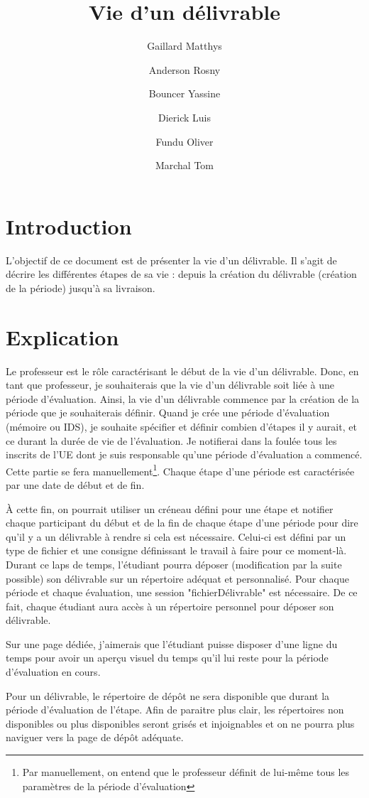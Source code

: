 \documentclass[a4paper,11pt, oneside]{article}
\title{Vie d'un délivrable}
\author{Gaillard Matthys \and Anderson Rosny \and Bouncer Yassine \and Dierick Luis \and Fundu Oliver\and Marchal Tom}
\newcommand{\li}{\newline}
\begin{document}
\maketitle
\section{Introduction}
    \par L'objectif de ce document est de présenter la vie d'un délivrable. Il s'agit de décrire les différentes étapes de sa vie : depuis
    la création du délivrable (création de la période) jusqu'à sa livraison. 
\section{Explication}
    \par Le professeur est le rôle caractérisant le début de la vie d'un délivrable. Donc, en tant que professeur, je 
    souhaiterais que la vie d'un délivrable soit liée à une période d'évaluation. Ainsi, la vie d'un délivrable commence par la création de la période que je souhaiterais définir.
    Quand je crée une période d'évaluation (mémoire ou IDS), je souhaite spécifier et définir combien d'étapes il y aurait, et ce durant la durée de vie de l'évaluation. Je notifierai
    dans la foulée tous les inscrits de l'UE dont je suis responsable qu'une période d'évaluation a commencé. Cette partie se fera manuellement\footnote{Par manuellement, on entend que le professeur définit de lui-même tous les paramètres de la période d'évaluation}. Chaque étape d'une période est caractérisée par une date de début et de fin.\li

    \par À cette fin, on pourrait utiliser un créneau défini pour une étape et notifier chaque participant du début et de la fin de chaque étape d'une période pour dire qu'il y a un délivrable à rendre si cela est nécessaire.
    Celui-ci est défini par un type de fichier et une consigne définissant le travail à faire pour ce moment-là. Durant ce laps de temps, l'étudiant pourra déposer (modification par la suite possible) son délivrable sur un répertoire adéquat et personnalisé. Pour chaque période et chaque évaluation, 
    une session "fichierDélivrable" est nécessaire. De ce fait, chaque étudiant aura accès à un répertoire personnel pour déposer son délivrable. \li

    \par Sur une page dédiée, j'aimerais que l'étudiant puisse disposer d'une ligne du temps pour avoir un aperçu visuel du temps qu'il lui reste pour la période d'évaluation en cours.\li 

    \par Pour un délivrable, le répertoire de dépôt ne sera disponible que durant la période d'évaluation de l'étape. Afin de paraitre plus clair, les répertoires non disponibles ou plus disponibles seront grisés et injoignables et on ne pourra plus naviguer vers la page de dépôt adéquate.
\end{document}
